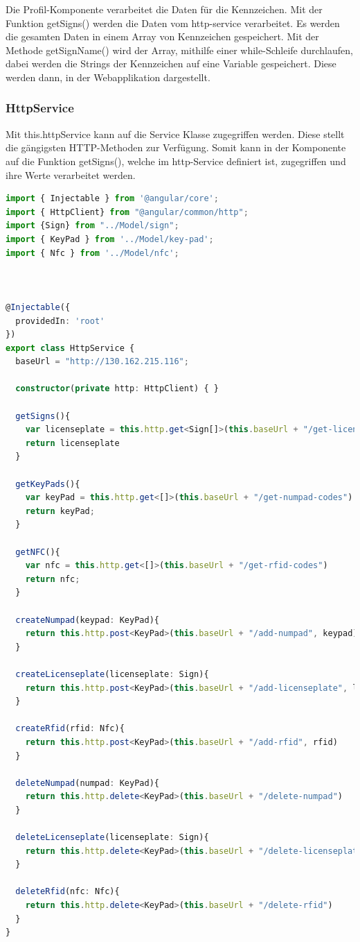 Die Profil-Komponente verarbeitet die Daten für die Kennzeichen. Mit der Funktion getSigns() werden die Daten vom http-service verarbeitet. Es werden die gesamten Daten in einem Array von Kennzeichen gespeichert. Mit der Methode getSignName() wird der Array, mithilfe einer while-Schleife durchlaufen, dabei werden die Strings der Kennzeichen auf eine Variable gespeichert. Diese werden dann, in der Webapplikation dargestellt.

\subsubsection{HttpService}
Mit this.httpService kann auf die Service Klasse zugegriffen werden. Diese stellt die gängigsten HTTP-Methoden zur Verfügung. Somit kann in der Komponente auf die Funktion getSigns(), welche im http-Service definiert ist, zugegriffen und ihre Werte verarbeitet werden.
\cite{HttpService}

\begin{lstlisting}[language=typeScript, caption=http.service.ts]
    import { Injectable } from '@angular/core';
import { HttpClient} from "@angular/common/http";
import {Sign} from "../Model/sign";
import { KeyPad } from '../Model/key-pad';
import { Nfc } from '../Model/nfc';



@Injectable({
  providedIn: 'root'
})
export class HttpService {
  baseUrl = "http://130.162.215.116";

  constructor(private http: HttpClient) { }

  getSigns(){
    var licenseplate = this.http.get<Sign[]>(this.baseUrl + "/get-licenseplates")
    return licenseplate
  }

  getKeyPads(){
    var keyPad = this.http.get<[]>(this.baseUrl + "/get-numpad-codes")
    return keyPad;
  }

  getNFC(){
    var nfc = this.http.get<[]>(this.baseUrl + "/get-rfid-codes")
    return nfc;
  }

  createNumpad(keypad: KeyPad){
    return this.http.post<KeyPad>(this.baseUrl + "/add-numpad", keypad)
  }

  createLicenseplate(licenseplate: Sign){
    return this.http.post<KeyPad>(this.baseUrl + "/add-licenseplate", licenseplate)
  }

  createRfid(rfid: Nfc){
    return this.http.post<KeyPad>(this.baseUrl + "/add-rfid", rfid)
  }

  deleteNumpad(numpad: KeyPad){
    return this.http.delete<KeyPad>(this.baseUrl + "/delete-numpad")
  }

  deleteLicenseplate(licenseplate: Sign){
    return this.http.delete<KeyPad>(this.baseUrl + "/delete-licenseplate")
  }

  deleteRfid(nfc: Nfc){
    return this.http.delete<KeyPad>(this.baseUrl + "/delete-rfid")
  }
}
\end{lstlisting}


